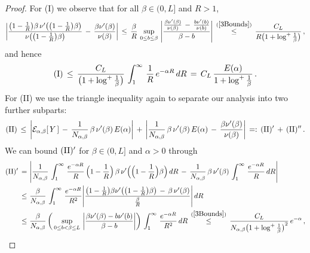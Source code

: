 \documentclass[10pt]{article}
\def\stackrel#1#2{\mathrel{\mathop{#2}\limits^{#1}}}
\numberwithin{equation}{section}
\theoremstyle{definition}
\begin{document}
\begin{proof}
For (I) we observe that  for all $ \beta \in (0 , L]  $ and  $R>1$,
\begin{align*}
  \bigg| \frac{ \big(1-\frac{1}{R}\big)\beta \,\nu'\big( \big(1-\frac{1}{R}\big)\beta\big)  }{ \nu\big( \big(1-\frac{1}{R}\big) \beta\big)}  \,-\, \frac{\beta \nu'(\beta)}{ \nu(\beta)} \bigg| 
  \,\leq  \, \frac{\beta}{R}\, \sup_{0\leq b\leq \beta}  \,  \Bigg| \frac{\frac{\beta \nu'(\beta)}{ \nu(\beta)}\,-\,\frac{b \nu'(b)}{ \nu(b)}   }{\beta-b  }  \Bigg|  \,\stackrel{(\ref{3Bounds})}{\leq} \,\frac{C_L}{R\big(1+\log^+ \frac{1}{\beta} \big)  }\,, \nonumber 
\end{align*}
and hence
\begin{align}\label{Izep0}
\textup{(I)}\,\leq \,\frac{C_L}{\big(1+\log^+ \frac{1}{\beta} \big)  }\,\int^{\infty}_1 \,\frac{1}{R} \,e^{-\alpha R} \, dR\,=\,C_L\,\frac{E( \alpha)}{ 1+\log^+ \frac{1}{\beta}   }\,.
\end{align}
For (II) we use the triangle inequality again to separate our analysis into two further subparts:
\begin{align*}
\textup{(II)}\,\leq \,\bigg| \mathcal{E}_{\alpha,\beta}[\, Y\,]\,-\,   \frac{1}{N_{\alpha,\beta} }\,\beta\, \nu'( \beta)\,E(\alpha)\bigg| \,+\,\bigg|  \frac{1}{N_{\alpha,\beta} }\,\beta\, \nu'( \beta)\,E(\alpha) \,-\,\frac{ \beta \nu'( \beta)  }{ \nu( \beta)  }  \bigg|\,=:\,(\textup{II})'\,+\,(\textup{II})''\,.
\end{align*}
We can bound $(\textup{II})'$ for $ \beta\in (0,  L]  $ and $\alpha >0$ through
\begin{align}\label{Izep1}
 (\textup{II})'\,= \,&\,    \Bigg| \frac{1}{N_{\alpha,\beta} }\,\int_1^{\infty}\,\frac{ e^{-\alpha R  } }{ R}\,\Big(1-\frac{1}{R}\Big)\,\beta\, \nu'\Big( \Big(1-\frac{1}{R}\Big) \beta \Big)\,dR\,-\,   \frac{1}{N_{\alpha,\beta} }\,\beta\, \nu'( \beta)\,\int_1^{\infty}\,\frac{ e^{-\alpha R } }{ R }\,dR\Bigg| \nonumber   \\
    \,\leq \,&\, \frac{\beta }{N_{\alpha,\beta} }\,\int_1^{\infty}\,\frac{ e^{-\alpha R } }{ R^2 }\Bigg|\frac{\big(1-\frac{1}{R}\big)\beta \nu'\big( \big(1-\frac{1}{R}\big) \beta \big) \,-\, \beta\, \nu'( \beta) }{\frac{\beta}{R} } \Bigg|\, dR \nonumber 
    \\
    \,\leq \,&\,  \frac{\beta }{N_{\alpha,\beta} }\, \bigg(\sup_{  0 \leq b < \beta\leq L}\, \bigg|\frac{ \beta \nu'(\beta)-   b\nu'(b)  }{\beta-b } \bigg| \bigg)\,\int_1^{\infty}\,\frac{ e^{-\alpha R } }{R^2 }\,dR
       \,\stackrel{ (\ref{3Bounds}) }{ \leq} \,   \frac{C_L }{N_{\alpha,\beta} \big(1+\log^+ \frac{1}{\beta}\big)^2} \,e^{-\alpha}\,,

\end{align}
\end{proof}
\end{document}
